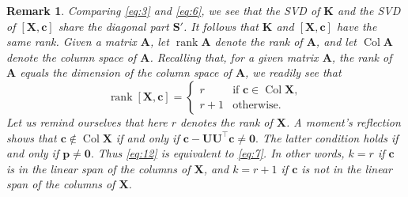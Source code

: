 \documentclass[11pt,a4paper]{article}
\theoremstyle{break}
\numberwithin{dummy}{section}
\theoremstyle{plain}
\theoremstyle{plain}
\theoremstyle{plain}
\theoremstyle{plain}
\theoremstyle{plain}
\newtheorem{remark}{Remark}[section]
\theoremstyle{MyNonumberplain}
\DeclareMathOperator*{\rk}{rank}
\DeclareMathOperator{\col}{Col}
\newcommand{\0}{\M{0}}
\newcommand{\M}[1]{\mathbf{#1}}
\newcommand{\T}{\top}
\newcommand{\ve}[1]{\mathbf{#1}}
\begin{document}
\begin{remark}
  \label{rmk:1}
  Comparing \eqref{eq:3} and \eqref{eq:6}, we see that the SVD of $\M{K}$ and the SVD of $[\M{X}, \ve{c}]$ share the diagonal part $\M{S}'$.  It follows that $\M{K}$ and $[\M{X}, \ve{c}]$ have the same rank. Given a matrix $\M{A}$, let $\rk \M{A}$ denote the rank of $\M{A}$, and let $\col \M{A}$ denote the column space of $\M{A}$. Recalling that, for a given matrix $\M{A}$, the rank of $\M{A}$ equals the dimension of the column space of $\M{A}$, we readily see that
  \begin{equation}
    \label{eq:12}
    \rk [\M{X}, \ve{c}] =
    \begin{cases}
      r & \text{if $\ve{c} \in \col \M{X}$},
      \\
      r + 1 & \text{otherwise}.
    \end{cases}
  \end{equation}
  Let us remind ourselves that here $r$ denotes the rank of $\M{X}$.  A moment's reflection shows that $\ve{c} \notin \col \M{X}$ if and only if
  \begin{math}
    \ve{c} - \M{U} \M{U}^\T \ve{c} \neq \0.
  \end{math}
  The latter condition holds if and only if
  \begin{math}
    \ve{p} \neq \0.
  \end{math}
  Thus \eqref{eq:12} is equivalent to \eqref{eq:7}. In other words, $k = r$ if $\ve{c}$ is in the linear span of the columns of $\M{X}$, and $k = r+1$ if $\ve{c}$ is not in the linear span of the columns of $\M{X}$.
\end{remark}


\end{document}
